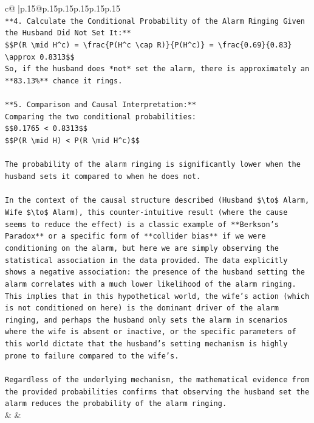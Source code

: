 \documentclass{article}
\begin{document}
{\begin{supertabular}{c@{$\;$}|p{.15\linewidth}@{}p{.15\linewidth}p{.15\linewidth}p{.15\linewidth}p{.15\linewidth}p{.15\linewidth}}
{{{\\ 
\texttt{**4. Calculate the Conditional Probability of the Alarm Ringing Given the Husband Did Not Set It:**} \\
\texttt{\$\$P(R \textbackslash{}mid H\^{}c) = \textbackslash{}frac\{P(H\^{}c \textbackslash{}cap R)\}\{P(H\^{}c)\} = \textbackslash{}frac\{0.69\}\{0.83\} \textbackslash{}approx 0.8313\$\$} \\
\texttt{So, if the husband does *not* set the alarm, there is approximately an **83.13\%** chance it rings.} \\
\\ 
\texttt{**5. Comparison and Causal Interpretation:**} \\
\texttt{Comparing the two conditional probabilities:} \\
\texttt{\$\$0.1765 < 0.8313\$\$} \\
\texttt{\$\$P(R \textbackslash{}mid H) < P(R \textbackslash{}mid H\^{}c)\$\$} \\
\\ 
\texttt{The probability of the alarm ringing is significantly lower when the husband sets it compared to when he does not.} \\
\\ 
\texttt{In the context of the causal structure described (Husband \$\textbackslash{}to\$ Alarm, Wife \$\textbackslash{}to\$ Alarm), this counter{-}intuitive result (where the cause seems to reduce the effect) is a classic example of **Berkson's Paradox** or a specific form of **collider bias** if we were conditioning on the alarm, but here we are simply observing the statistical association in the data provided. The data explicitly shows a negative association: the presence of the husband setting the alarm correlates with a much lower likelihood of the alarm ringing. This implies that in this hypothetical world, the wife's action (which is not conditioned on here) is the dominant driver of the alarm ringing, and perhaps the husband only sets the alarm in scenarios where the wife is absent or inactive, or the specific parameters of this world dictate that the husband's setting mechanism is highly prone to failure compared to the wife's.} \\
\\ 
\texttt{Regardless of the underlying mechanism, the mathematical evidence from the provided probabilities confirms that observing the husband set the alarm reduces the probability of the alarm ringing.} \\
            }
        }
    }
    & & \\ \\


\end{supertabular}}
\end{document}
